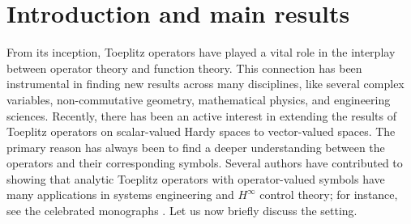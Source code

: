 \documentclass[12pt]{amsart}
\theoremstyle{definition}
\newcommand{\1}{{\mbox{\bf 1}}}
\begin{document}

\maketitle

\section{Introduction and main results}
From its inception, Toeplitz operators have played a vital role in the interplay between operator theory and function theory. This connection has been instrumental in finding new results across many disciplines, like several complex variables, non-commutative geometry, mathematical physics, and engineering sciences. Recently, there has been an active interest in extending the results of Toeplitz operators on scalar-valued Hardy spaces to vector-valued spaces. The primary reason has always been to find a deeper understanding between the operators and their corresponding symbols. Several authors have contributed to showing that analytic Toeplitz operators with operator-valued symbols have many applications in systems engineering and $H^{\infty}$ control theory; for instance, see the celebrated monographs \cite{BRG, FF}. Let us now briefly discuss the setting.
\end{document}
